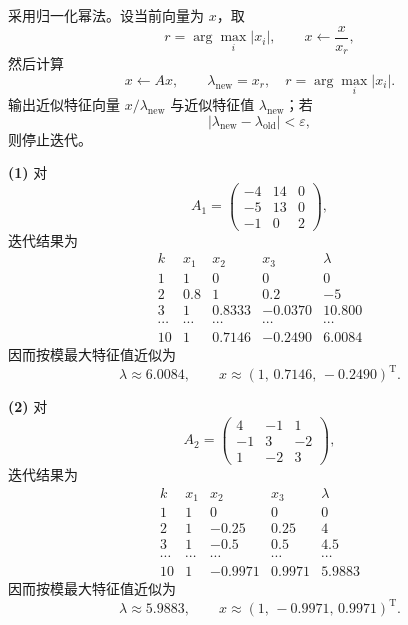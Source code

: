 \documentclass[11pt, a4paper]{ctexart}
\begin{document}
\begin{solution}
    采用归一化幂法。设当前向量为 $x$，取
    \[
        r = \arg\max_i |x_i|,
        \qquad
        x \leftarrow \frac{x}{x_r},
    \]
    然后计算
    \[
        x \leftarrow Ax,\qquad
        \lambda_{\text{new}} = x_r,\quad r = \arg\max_i |x_i|.
    \]
    输出近似特征向量 $x/\lambda_{\text{new}}$ 与近似特征值 $\lambda_{\text{new}}$；若
    \[
        |\lambda_{\text{new}}-\lambda_{\text{old}}|<\varepsilon,
    \]
    则停止迭代。

    \textbf{(1)} 对
    \[
        A_1 =
        \begin{pmatrix}
            -4 & 14 & 0 \\
            -5 & 13 & 0 \\
            -1 & 0 & 2
        \end{pmatrix},
    \]
    迭代结果为
    \[
        \renewcommand{\arraystretch}{1.15}
        \begin{array}{c|rrrr}
            k & x_1 & x_2 & x_3 & \lambda \\ \hline
            1 & 1 & 0 & 0 & 0 \\
            2 & 0.8 & 1 & 0.2 & -5 \\
            3 & 1 & 0.8333 & -0.0370 & 10.800 \\
            \cdots & \cdots & \cdots & \cdots & \cdots \\
            10 & 1 & 0.7146 & -0.2490 & 6.0084
        \end{array}
    \]
    因而按模最大特征值近似为
    \[
        \lambda \approx 6.0084,
        \qquad
        x \approx (1,\,0.7146,\,-0.2490)^{\mathrm{T}}.
    \]

    \textbf{(2)} 对
    \[
        A_2 =
        \begin{pmatrix}
            4 & -1 & 1 \\
            -1 & 3 & -2 \\
            1 & -2 & 3
        \end{pmatrix},
    \]
    迭代结果为
    \[
        \renewcommand{\arraystretch}{1.15}
        \begin{array}{c|rrrr}
            k & x_1 & x_2 & x_3 & \lambda \\ \hline
            1 & 1 & 0 & 0 & 0 \\
            2 & 1 & -0.25 & 0.25 & 4 \\
            3 & 1 & -0.5 & 0.5 & 4.5 \\
            \cdots & \cdots & \cdots & \cdots & \cdots \\
            10 & 1 & -0.9971 & 0.9971 & 5.9883
        \end{array}
    \]
    因而按模最大特征值近似为
    \[
        \lambda \approx 5.9883,
        \qquad
        x \approx (1,\,-0.9971,\,0.9971)^{\mathrm{T}}.
    \]
\end{solution}
\end{document}
